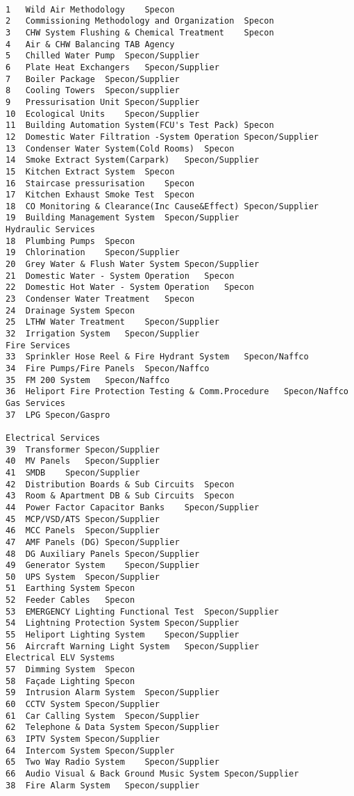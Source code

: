 \begin{verbatim}

1	Wild Air Methodology	Specon
2	Commissioning Methodology and Organization	Specon
3	CHW System Flushing & Chemical Treatment	Specon
4	Air & CHW Balancing	TAB Agency
5	Chilled Water Pump	Specon/Supplier
6	Plate Heat Exchangers	Specon/Supplier
7	Boiler Package	Specon/Supplier
8	Cooling Towers	Specon/supplier
9	Pressurisation Unit	Specon/Supplier
10	Ecological Units	Specon/Supplier
11	Building Automation System(FCU's Test Pack)	Specon
12	Domestic Water Filtration -System Operation	Specon/Supplier
13	Condenser Water System(Cold Rooms)	Specon
14	Smoke Extract System(Carpark)	Specon/Supplier
15	Kitchen Extract System	Specon
16	Staircase pressurisation	Specon
17	Kitchen Exhaust Smoke Test	Specon
18	CO Monitoring & Clearance(Inc Cause&Effect)	Specon/Supplier
19	Building Management System	Specon/Supplier
Hydraulic Services		
18	Plumbing Pumps	Specon
19	Chlorination	Specon/Supplier
20	Grey Water & Flush Water System	Specon/Supplier
21	Domestic Water - System Operation	Specon
22	Domestic Hot Water - System Operation	Specon
23	Condenser Water Treatment	Specon
24	Drainage System	Specon
25	LTHW Water Treatment	Specon/Supplier
32	Irrigation System	Specon/Supplier
Fire Services		
33	Sprinkler Hose Reel & Fire Hydrant System	Specon/Naffco
34	Fire Pumps/Fire Panels	Specon/Naffco
35	FM 200 System	Specon/Naffco
36	Heliport Fire Protection Testing & Comm.Procedure	Specon/Naffco
Gas Services		
37	LPG	Specon/Gaspro
		
Electrical Services		
39	Transformer	Specon/Supplier
40	MV Panels	Specon/Supplier
41	SMDB	Specon/Supplier
42	Distribution Boards & Sub Circuits	Specon
43	Room & Apartment DB & Sub Circuits	Specon
44	Power Factor Capacitor Banks	Specon/Supplier
45	MCP/VSD/ATS	Specon/Supplier
46	MCC Panels	Specon/Supplier
47	AMF Panels (DG)	Specon/Supplier
48	DG Auxiliary Panels	Specon/Supplier
49	Generator System	Specon/Supplier
50	UPS System	Specon/Supplier
51	Earthing System	Specon
52	Feeder Cables	Specon
53	EMERGENCY Lighting Functional Test	Specon/Supplier
54	Lightning Protection System	Specon/Supplier
55	Heliport Lighting System	Specon/Supplier
56	Aircraft Warning Light System	Specon/Supplier
Electrical ELV Systems		
57	Dimming System	Specon
58	Façade Lighting	Specon
59	Intrusion Alarm System	Specon/Supplier
60	CCTV System	Specon/Supplier
61	Car Calling System	Specon/Supplier
62	Telephone & Data System	Specon/Supplier
63	IPTV System	Specon/Supplier
64	Intercom System	Specon/Suppler
65	Two Way Radio System	Specon/Supplier
66	Audio Visual & Back Ground Music System	Specon/Supplier
38	Fire Alarm System	Specon/supplier

\end{verbatim}





